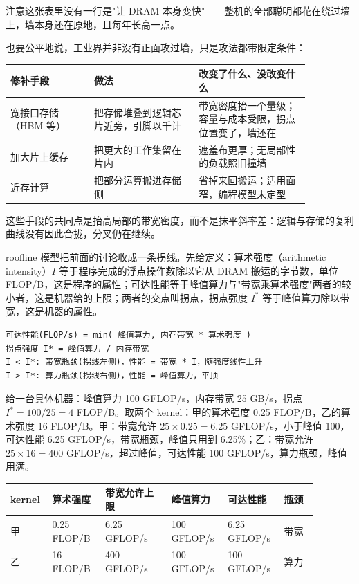 注意这张表里没有一行是"让 DRAM 本身变快"——整机的全部聪明都花在绕过墙上，墙本身还在原地，且每年长高一点。

也要公平地说，工业界并非没有正面攻过墙，只是攻法都带限定条件：

\begin{longtable}{L{0.24\linewidth}L{0.30\linewidth}L{0.32\linewidth}}
\toprule
修补手段 & 做法 & 改变了什么、没改变什么 \\
\midrule
宽接口存储（HBM 等） & 把存储堆叠到逻辑芯片近旁，引脚以千计 & 带宽密度抬一个量级；容量与成本受限，拐点位置变了，墙还在 \\
加大片上缓存 & 把更大的工作集留在片内 & 遮羞布更厚；无局部性的负载照旧撞墙 \\
近存计算 & 把部分运算搬进存储侧 & 省掉来回搬运；适用面窄，编程模型未定型 \\
\bottomrule
\end{longtable}

这些手段的共同点是抬高局部的带宽密度，而不是抹平斜率差：逻辑与存储的复利曲线没有因此合拢，分叉仍在继续。

roofline 模型把前面的讨论收成一条拐线。先给定义：算术强度（arithmetic intensity）$I$ 等于程序完成的浮点操作数除以它从 DRAM 搬运的字节数，单位 FLOP/B，这是程序的属性；可达性能等于峰值算力与"带宽乘算术强度"两者的较小者，这是机器给的上限；两者的交点叫拐点，拐点强度 $I^{*}$ 等于峰值算力除以带宽，这是机器的属性。

\begin{lstlisting}
可达性能(FLOP/s) = min( 峰值算力, 内存带宽 * 算术强度 )
拐点强度 I* = 峰值算力 / 内存带宽
I < I*: 带宽瓶颈(拐线左侧)，性能 = 带宽 * I，随强度线性上升
I > I*: 算力瓶颈(拐线右侧)，性能 = 峰值算力，平顶
\end{lstlisting}

给一台具体机器：峰值算力 100 GFLOP/s，内存带宽 25 GB/s，拐点 $I^{*}=100/25=4$ FLOP/B。取两个 kernel：甲的算术强度 0.25 FLOP/B，乙的算术强度 16 FLOP/B。甲：带宽允许 $25\times0.25=6.25$ GFLOP/s，小于峰值 100，可达性能 6.25 GFLOP/s，带宽瓶颈，峰值只用到 6.25\%；乙：带宽允许 $25\times16=400$ GFLOP/s，超过峰值，可达性能 100 GFLOP/s，算力瓶颈，峰值用满。

\begin{longtable}{L{0.10\linewidth}L{0.16\linewidth}L{0.20\linewidth}L{0.16\linewidth}L{0.16\linewidth}L{0.10\linewidth}}
\toprule
kernel & 算术强度 & 带宽允许上限 & 峰值算力 & 可达性能 & 瓶颈 \\
\midrule
甲 & 0.25 FLOP/B & 6.25 GFLOP/s & 100 GFLOP/s & 6.25 GFLOP/s & 带宽 \\
乙 & 16 FLOP/B & 400 GFLOP/s & 100 GFLOP/s & 100 GFLOP/s & 算力 \\
\bottomrule
\end{longtable}

